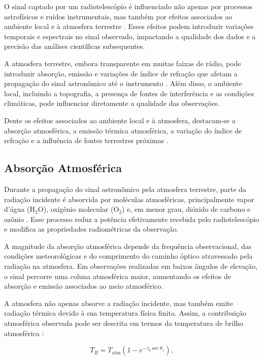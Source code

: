 O sinal captado por um radiotelescópio é influenciado não apenas por processos astrofísicos e ruídos instrumentais, mas também por efeitos associados ao ambiente local e à atmosfera terrestre \cite{Souza2024}. Esses efeitos podem introduzir variações temporais e espectrais no sinal observado, impactando a qualidade dos dados e a precisão das análises científicas subsequentes.

A atmosfera terrestre, embora transparente em muitas faixas de rádio, pode introduzir absorção, emissão e variações de índice de refração que afetam a propagação do sinal astronômico até o instrumento \cite{thompson2017interferometry}. Além disso, o ambiente local, incluindo a topografia, a presença de fontes de interferência e as condições climáticas, pode influenciar diretamente a qualidade das observações.

Dente os efeitos associados ao ambiente local e à atmosfera, destacam-se a absorção atmosférica, a emissão térmica atmosférica, a variação do índice de refração e a influência de fontes terrestres próximas \cite{Souza2024,Pimental2022}.

\subsection{Absorção Atmosférica}

Durante a propagação do sinal astronômico pela atmosfera terrestre, parte da radiação incidente é absorvida por moléculas atmosféricas, principalmente vapor d'água (\(\mathrm{H_2O}\)), oxigênio molecular (\(\mathrm{O_2}\)) e, em menor grau, dióxido de carbono e ozônio \cite{thompson2017interferometry,wilson2013tools}. Esse processo reduz a potência efetivamente recebida pelo radiotelescópio e modifica as propriedades radiométricas da observação.

A magnitude da absorção atmosférica depende da frequência observacional, das condições meteorológicas e do comprimento do caminho óptico atravessado pela radiação na atmosfera. Em observações realizadas em baixos ângulos de elevação, o sinal percorre uma coluna atmosférica maior, aumentando os efeitos de absorção e emissão associados ao meio atmosférico.

A atmosfera não apenas absorve a radiação incidente, mas também emite radiação térmica devido à sua temperatura física finita. Assim, a contribuição atmosférica observada pode ser descrita em termos da temperatura de brilho atmosférica \cite{thompson2017interferometry}:

\begin{equation}
T_B =
T_{\mathrm{atm}}
\left(
1 - e^{-\tau_0 \sec\theta_z}
\right),
\label{eq:atm_brightness}
\end{equation}

